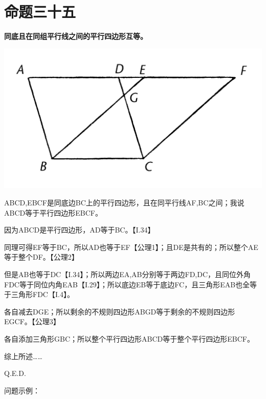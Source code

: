 \documentclass[
]{book}
\begin{document}
\hypertarget{ux547dux9898ux4e09ux5341ux4e94}{%
\section{命题三十五}\label{ux547dux9898ux4e09ux5341ux4e94}}

\textbf{同底且在同组平行线之间的平行四边形互等。}

\includegraphics[width=0.5\linewidth]{./image/img526}

ABCD,EBCF是同底边BC上的平行四边形，且在同平行线AF,BC之间；我说ABCD等于平行四边形EBCF。

因为ABCD是平行四边形，AD等于BC。【I.34】

同理可得EF等于BC，所以AD也等于EF【公理1】；且DE是共有的；所以整个AE等于整个DF。【公理2】

但是AB也等于DC【I.34】；所以两边EA,AB分别等于两边FD,DC，且同位外角FDC等于同位内角EAB【I.29】；所以底边EB等于底边FC，且三角形EAB也全等于三角形FDC【I.4】。

各自减去DGE；所以剩余的不规则四边形ABGD等于剩余的不规则四边形EGCF。【公理3】

各自添加三角形GBC；所以整个平行四边形ABCD等于整个平行四边形EBCF。

综上所述\ldots\ldots{}

Q.E.D.

问题示例：
\end{document}
